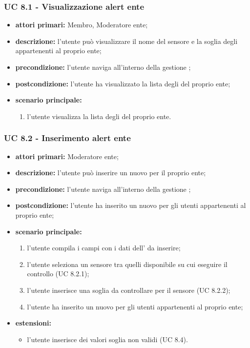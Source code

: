 			\subsubsection{UC 8.1 - Visualizzazione alert ente}
			\begin{itemize}
				\item \textbf{attori primari:} Membro, Moderatore ente;
				\item \textbf{descrizione:} l'utente può visualizzare il nome del sensore e la soglia degli  appartenenti al proprio ente;
				\item \textbf{precondizione:} l'utente naviga all'interno della gestione ;
				\item \textbf{postcondizione:} l'utente ha visualizzato la lista degli  del proprio ente;
				\item \textbf{scenario principale:}
				\begin{enumerate}
					\item{l'utente visualizza la lista degli  del proprio ente.}
				\end{enumerate}	
			\end{itemize}
			
			\subsubsection{UC 8.2 - Inserimento alert ente}
			\begin{itemize}
				\item \textbf{attori primari:} Moderatore ente;
				\item \textbf{descrizione:} l'utente può inserire un nuovo  per il proprio ente;
				\item \textbf{precondizione:} l'utente naviga all'interno della gestione ;
				\item \textbf{postcondizione:} l'utente ha inserito un nuovo  per gli utenti appartenenti al proprio ente;
				\item \textbf{scenario principale:}
				\begin{enumerate}
					\item{l'utente compila i campi con i dati dell' da inserire;}
					\item l'utente seleziona un sensore tra quelli disponibile su cui eseguire il controllo (UC 8.2.1);
					\item l'utente inserisce una soglia da controllare per il sensore (UC 8.2.2);
					\item{l'utente ha inserito un nuovo  per gli utenti appartenenti al proprio ente;}
				\end{enumerate}
				\item \textbf{estensioni:}
				\begin{itemize}
					\item l'utente inserisce dei valori soglia non validi (UC 8.4).
				\end{itemize}		
			\end{itemize}
			

